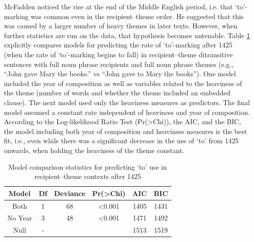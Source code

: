 McFadden noticed the rise at the end of the Middle English period, i.e. that `to'-marking was common even in the recipient--theme order. He suggested that this was caused by a larger number of heavy themes in later texts. However, when further statistics are run on the data, that hypothesis becomes untenable. Table \ref{tab:model-comp} explicitly compares models for predicting the rate of `to'-marking after 1425 (when the rate of `to'-marking begins to fall) in recipient--theme ditransitive sentences with full noun phrase recipients and full noun phrase themes (e.g., ``John gave Mary the books.'' vs ``John gave to Mary the books''). One model included the year of composition as well as variables related to the heaviness of the theme (number of words and whether the theme included an embedded clause). The next model used only the heaviness measures as predictors. The final model assumed a constant rate independent of heaviness and year of composition. According to the Log-likelihood Ratio Test (Pr(>Chi)), the AIC, and the BIC, the model including both year of composition and heaviness measures is the best fit, i.e., even while there was a significant decrease in the use of `to' from 1425 onwards, when holding the heaviness of the theme constant.

\begin{table}[ht!]
	\begin{tabular}{cccccc}
	\hline
	Model	& Df & Deviance & Pr(>Chi) & AIC & BIC\\
	\hline
	Both	& 1  & 68       & <0.001   & 1405 & 1431\\
	No Year & 3  & 48       & <0.001   & 1471 & 1492\\
	Null    & -  &          &          & 1513 & 1519\\
	\hline
	\end{tabular}
	\caption{Model comparison statistics for predicting `to' use in recipient--theme contexts after 1425}
	\label{tab:model-comp}
\end{table}

